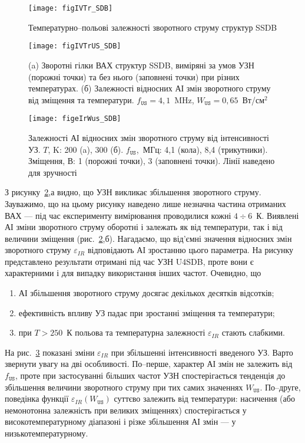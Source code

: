 \begin{figure}
\center
\texttt{[image: figIVTr\_SDB]}
\caption{\label{figIVTr_SDB}
Температурно--польові залежності зворотного струму структур SSDB
}%
\end{figure}

\begin{figure}
\center
\texttt{[image: figIVTrUS\_SDB]}
\caption{\label{figIVTrUS_SDB}
(a) Зворотні гілки ВАХ структур SSDB, виміряні за умов УЗН (порожні точки) та без нього (заповнені точки) при різних температурах.
(б) Залежності відносних АІ змін зворотного струму від зміщення та температури.
$f_\mathtt{US}=4,1$~MHz, $W_\mathtt{US}=0,65$~Вт/см$^2$
}%
\end{figure}

\begin{figure}
\center
\texttt{[image: figeIrWus\_SDB]}
\caption{\label{figeIrWus_SDB}
Залежності АІ відносних змін зворотного струму від інтенсивності УЗ.
$T$, K: 200 (a), 300 (б).
$f_\mathtt{US}$,~МГц: 4,1 (кола), 8,4 (трикутники).
Зміщення, В: 1 (порожні точки), 3 (заповнені точки).
Лінії наведено  для зручності
}%
\end{figure}

З рисунку~\ref{figIVTrUS_SDB},а видно, що УЗН викликає збільшення зворотного струму.
Зауважимо, що на цьому рисунку наведено лише незначна частина отриманих ВАХ ---
під час експерименту вимірювання проводилися кожні $4\div6$~К.
Виявлені АІ зміни зворотного струму оборотні і залежать як від температури, так і від величини зміщення (рис.~\ref{figIVTrUS_SDB},б).
Нагадаємо, що від'ємні значення відносних змін зворотного струму $\varepsilon_{IR}$ відповідають
АІ зростанню цього параметра.
На рисунку представлено результати отримані під час УЗН U4SDB, проте вони є характерними і
для випадку використання інших частот.
Очевидно, що
\begin{enumerate}[label=\asbuk*),leftmargin=0em,itemindent=1.5em]
\item АІ збільшення зворотного струму досягає декількох десятків відсотків;
\item ефективність впливу УЗ падає при зростанні зміщення та температури;
\item при $T>250$~К польова та температурна залежності $\varepsilon_{IR}$ стають слабкими.
\end{enumerate}

На рис.~\ref{figeIrWus_SDB} показані зміни $\varepsilon_{IR}$ при збільшенні інтенсивності введеного УЗ.
Варто звернути увагу на дві особливості.
По--перше, характер АІ змін не залежить від $f_\mathtt{US}$,
проте при застосуванні більших частот УЗН спостерігається тенденція до збільшення величини зворотного струму
при тих самих значеннях $W_\mathtt{US}$.
По--друге, поведінка функції $\varepsilon_{IR}(W_\mathtt{US})$ суттєво залежить від температури:
насичення (або немонотонна залежність при великих зміщеннях) спостерігається у високотемпературному діапазоні
і різке збільшення АІ змін --- у низькотемпературному.





